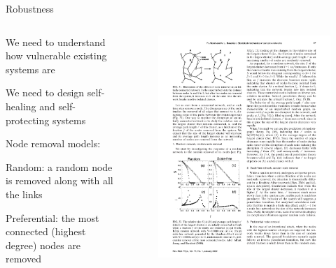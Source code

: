 \begin{frame}{Robustness}

\begin{columns}
\begin{column}{0.5\textwidth}
\BIL
\item We need to understand how vulnerable existing systems are
\item We need to design self-healing and self-protecting systems
\item Node removal models:
	\BI 
	\item \alert{Random}: a random node is removed along with all the links
	\item \alert{Preferential}: the most connected (highest degree) nodes are removed
	\EI
\EIL
\end{column}
\begin{column}{0.5\textwidth}

\begin{figure}
	\includegraphics[width=\textwidth]{robustness1.pdf}
\end{figure}
\end{column}
\end{columns}

\end{frame}

